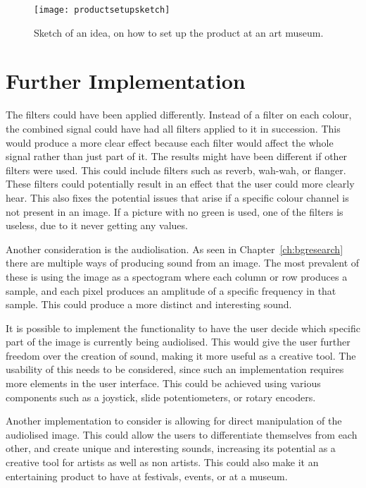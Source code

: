 \begin{figure}[!h]
\centering
\texttt{[image: productsetupsketch]}
\caption{\label{Fig:productsetupsketch} Sketch of an idea, on how to set up the product at an art museum.}
\end{figure}

\section{Further Implementation}
The filters could have been applied differently. Instead of a filter on each colour, the combined signal could have had all filters applied to it in succession. This would produce a more clear effect because each filter would affect the whole signal rather than just part of it. The results might have been different if other filters were used. This could include filters such as reverb, wah-wah, or flanger. These filters could potentially result in an effect that the user could more clearly hear. This also fixes the potential issues that arise if a specific colour channel is not present in an image. If a picture with no green is used, one of the filters is useless, due to it never getting any values. 

Another consideration is the audiolisation. As seen in Chapter~\ref{ch:bgresearch} there are multiple ways of producing sound from an image. The most prevalent of these is using the image as a spectogram where each column or row produces a sample, and each pixel produces an amplitude of a specific frequency in that sample. This could produce a more distinct and interesting sound. 

It is possible to implement the functionality to have the user decide which specific part of the image is currently being audiolised. This would give the user further freedom over the creation of sound, making it more useful as a creative tool. The usability of this needs to be considered, since such an implementation requires more elements in the user interface. This could be achieved using various components such as a joystick, slide potentiometers, or rotary encoders.

Another implementation to consider is allowing for direct manipulation of the audiolised image. This could allow the users to differentiate themselves from each other, and create unique and interesting sounds, increasing its potential as a creative tool for artists as well as non artists. This could also make it an entertaining product to have at festivals, events, or at a museum.

